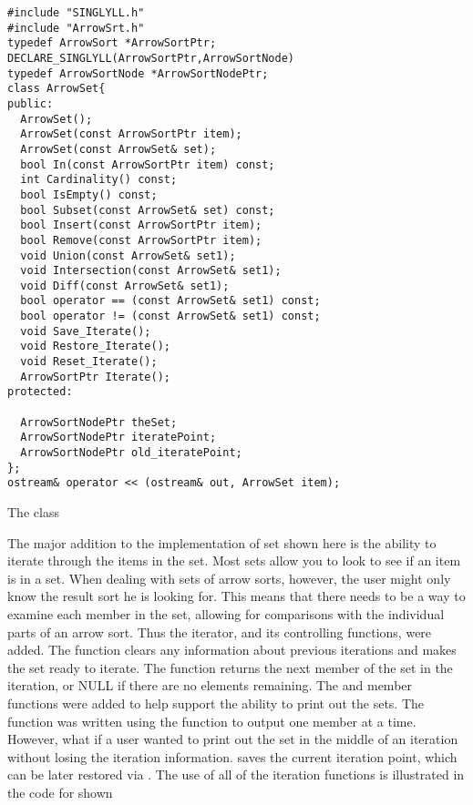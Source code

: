 \begin{BFIGURE}
\begin{verbatim}
#include "SINGLYLL.h"
#include "ArrowSrt.h"
typedef ArrowSort *ArrowSortPtr;
DECLARE_SINGLYLL(ArrowSortPtr,ArrowSortNode)
typedef ArrowSortNode *ArrowSortNodePtr;
class ArrowSet{
public:
  ArrowSet();
  ArrowSet(const ArrowSortPtr item);
  ArrowSet(const ArrowSet& set);
  bool In(const ArrowSortPtr item) const;
  int Cardinality() const;
  bool IsEmpty() const;
  bool Subset(const ArrowSet& set) const;
  bool Insert(const ArrowSortPtr item);
  bool Remove(const ArrowSortPtr item);
  void Union(const ArrowSet& set1);
  void Intersection(const ArrowSet& set1);
  void Diff(const ArrowSet& set1);
  bool operator == (const ArrowSet& set1) const;
  bool operator != (const ArrowSet& set1) const;
  void Save_Iterate();
  void Restore_Iterate();
  void Reset_Iterate();
  ArrowSortPtr Iterate();
protected:
  
  ArrowSortNodePtr theSet;
  ArrowSortNodePtr iteratePoint;
  ArrowSortNodePtr old_iteratePoint;
};
ostream& operator << (ostream& out, ArrowSet item);
\end{verbatim}
\caption{The  class}
\label{ArrowSet}
\end{BFIGURE}
The major addition to the implementation of set shown here is the
ability to iterate through the items in the set. Most sets allow you
to look to see if an item is in a set. When dealing with sets of arrow
sorts, however, the user might only know the result sort he is looking
for. This means that there needs to be a way to examine each member in
the set, allowing for comparisons with the individual parts of an
arrow sort. Thus the iterator, and its controlling functions, were
added. The  function clears any information
about previous iterations and makes the set ready to iterate. The
 function returns the next member of the set in
the iteration, or NULL if there are no elements remaining. The
 and  member
functions were added to help support the ability to print out the
sets. The  function was written using the
 function to output one member at a time. However,
what if a user wanted to print out the set in the middle of an
iteration without losing the iteration
information.  saves the current iteration
point, which can be later restored via
. The use of all of the iteration
functions is illustrated in the code for  shown

